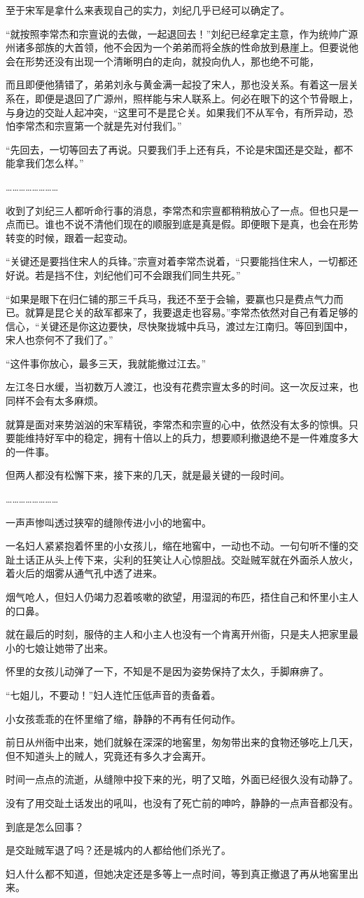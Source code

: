 至于宋军是拿什么来表现自己的实力，刘纪几乎已经可以确定了。

“就按照李常杰和宗亶说的去做，一起退回去！”刘纪已经拿定主意，作为统帅广源州诸多部族的大首领，他不会因为一个弟弟而将全族的性命放到悬崖上。但要说他会在形势还没有出现一个清晰明白的走向，就投向仇人，那也绝不可能，

而且即便他猜错了，弟弟刘永与黄金满一起投了宋人，那也没关系。有着这一层关系在，即便是退回了广源州，照样能与宋人联系上。何必在眼下的这个节骨眼上，与身边的交趾人起冲突，“这里可不是昆仑关。如果我们不从军令，有所异动，恐怕李常杰和宗亶第一个就是先对付我们。”

“先回去，一切等回去了再说。只要我们手上还有兵，不论是宋国还是交趾，都不能拿我们怎么样。”

……………………

收到了刘纪三人都听命行事的消息，李常杰和宗亶都稍稍放心了一点。但也只是一点而已。谁也不说不清他们现在的顺服到底是真是假。即便眼下是真，也会在形势转变的时候，跟着一起变动。

“关键还是要挡住宋人的兵锋。”宗亶对着李常杰说着，“只要能挡住宋人，一切都还好说。若是挡不住，刘纪他们可不会跟我们同生共死。”

“如果是眼下在归仁铺的那三千兵马，我还不至于会输，要赢也只是费点气力而已。就算是昆仑关的敌军都来了，我要退走也容易。”李常杰依然对自己有着足够的信心，“关键还是你这边要快，尽快聚拢城中兵马，渡过左江南归。等回到国中，宋人也奈何不了我们了。”

“这件事你放心，最多三天，我就能撤过江去。”

左江冬日水缓，当初数万人渡江，也没有花费宗亶太多的时间。这一次反过来，也同样不会有太多麻烦。

就算是面对来势汹汹的宋军精锐，李常杰和宗亶的心中，依然没有太多的惊惧。只要能维持好军中的稳定，拥有十倍以上的兵力，想要顺利撤退绝不是一件难度多大的一件事。

但两人都没有松懈下来，接下来的几天，就是最关键的一段时间。

……………………

一声声惨叫透过狭窄的缝隙传进小小的地窖中。

一名妇人紧紧抱着怀里的小女孩儿，缩在地窖中，一动也不动。一句句听不懂的交趾土话正从头上传下来，尖利的狂笑让人心惊胆战。交趾贼军就在外面杀人放火，着火后的烟雾从通气孔中透了进来。

烟气呛人，但妇人仍竭力忍着咳嗽的欲望，用湿润的布匹，捂住自己和怀里小主人的口鼻。

就在最后的时刻，服侍的主人和小主人也没有一个肯离开州衙，只是夫人把家里最小的七娘让她带了出来。

怀里的女孩儿动弹了一下，不知是不是因为姿势保持了太久，手脚麻痹了。

“七姐儿，不要动！”妇人连忙压低声音的责备着。

小女孩乖乖的在怀里缩了缩，静静的不再有任何动作。

前日从州衙中出来，她们就躲在深深的地窖里，匆匆带出来的食物还够吃上几天，但不知道头上的贼人，究竟还有多久才会离开。

时间一点点的流逝，从缝隙中投下来的光，明了又暗，外面已经很久没有动静了。

没有了用交趾土话发出的吼叫，也没有了死亡前的呻吟，静静的一点声音都没有。

到底是怎么回事？

是交趾贼军退了吗？还是城内的人都给他们杀光了。

妇人什么都不知道，但她决定还是多等上一点时间，等到真正撤退了再从地窖里出来。

